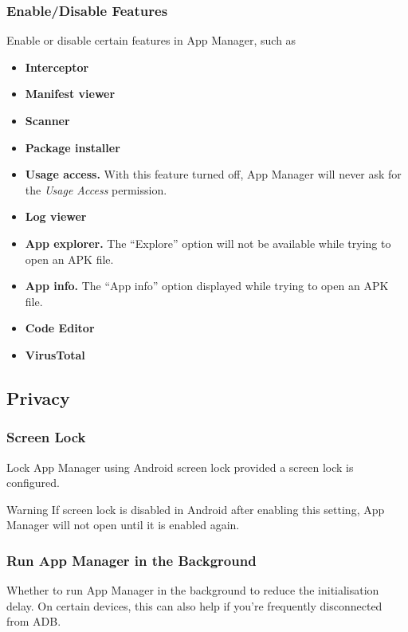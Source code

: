 \subsubsection{Enable/Disable Features}\label{subsubsec:enable/disable-features} %
Enable or disable certain features in App Manager, such as
\begin{itemize}
    \item \textbf{Interceptor}
    \item \textbf{Manifest viewer}
    \item \textbf{Scanner}
    \item \textbf{Package installer}
    \item \textbf{Usage access.} With this feature turned off, App Manager will never ask for the \textit{Usage Access} permission.
    \item \textbf{Log viewer}
    \item \textbf{App explorer.} The ``Explore'' option will not be available while trying to open an APK file.
    \item \textbf{App info.} The ``App info'' option displayed while trying to open an APK file.
    \item \textbf{Code Editor}
    \item \textbf{VirusTotal}
\end{itemize}

\subsection{Privacy}\label{subsec:privacy} %

\subsubsection{Screen Lock}\label{subsubsec:screen-lock} %
Lock App Manager using Android screen lock provided a screen lock is configured.

\begin{warning}{Warning}
    If screen lock is disabled in Android after enabling this setting, App Manager will not open until it is enabled again.
\end{warning}

\subsubsection{Run App Manager in the Background}\label{subsubsec:run-am-in-background} %
Whether to run App Manager in the background to reduce the initialisation delay. On certain devices,
this can also help if you're frequently disconnected from ADB\@.

